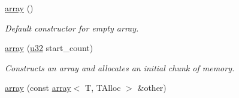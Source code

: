 \begin{DoxyCompactItemize}
\item 
\hyperlink{classirr_1_1core_1_1array_a5e0dd817352068af92448a08716f1252}{array} ()\hypertarget{classirr_1_1core_1_1array_a5e0dd817352068af92448a08716f1252}{}\label{classirr_1_1core_1_1array_a5e0dd817352068af92448a08716f1252}

\begin{DoxyCompactList}\small\item\em Default constructor for empty array. \end{DoxyCompactList}\item 
\hyperlink{classirr_1_1core_1_1array_ab58c4b2c09693190b43ee16e99722b43}{array} (\hyperlink{namespaceirr_a0416a53257075833e7002efd0a18e804}{u32} start\+\_\+count)
\begin{DoxyCompactList}\small\item\em Constructs an array and allocates an initial chunk of memory. \end{DoxyCompactList}\item 
\hyperlink{classirr_1_1core_1_1array_a4e584fd375dd5f994b6bd7afd7f7a60c}{array} (const \hyperlink{classirr_1_1core_1_1array}{array}$<$ T, T\+Alloc $>$ \&other)\hypertarget{classirr_1_1core_1_1array_a4e584fd375dd5f994b6bd7afd7f7a60c}{}\label{classirr_1_1core_1_1array_a4e584fd375dd5f994b6bd7afd7f7a60c}


\end{DoxyCompactItemize}
